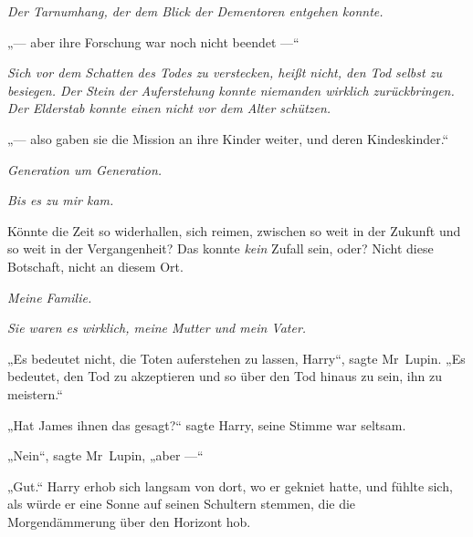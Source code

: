 \emph{Der Tarnumhang, der dem Blick der Dementoren entgehen konnte.}

 „— aber ihre Forschung war noch nicht beendet —“

\emph{Sich vor dem Schatten des Todes zu verstecken, heißt nicht, den Tod selbst zu besiegen. Der Stein der Auferstehung konnte niemanden wirklich zurückbringen. Der Elderstab konnte einen nicht vor dem Alter schützen.}

„— also gaben sie die Mission an ihre Kinder weiter, und deren Kindeskinder.“

\emph{Generation um Generation.}

\emph{Bis es zu mir kam.}

Könnte die Zeit so widerhallen, sich reimen, zwischen so weit in der Zukunft und so weit in der Vergangenheit? Das konnte \emph{kein} Zufall sein, oder? Nicht diese Botschaft, nicht an diesem Ort.

\emph{Meine Familie.}

\emph{Sie waren es wirklich, meine Mutter und mein Vater.}

„Es bedeutet nicht, die Toten auferstehen zu lassen, Harry“, sagte Mr~Lupin.
„Es bedeutet, den Tod zu akzeptieren und so über den Tod hinaus zu sein, ihn zu meistern.“

„Hat James ihnen das gesagt?“ sagte Harry, seine Stimme war seltsam.

„Nein“, sagte Mr~Lupin, „aber —“


„Gut.“ Harry erhob sich langsam von dort, wo er gekniet hatte, und fühlte sich, als würde er eine Sonne auf seinen Schultern stemmen, die die Morgendämmerung über den Horizont hob.

